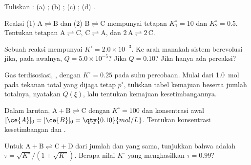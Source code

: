 \begin{exercise}[$\star$]\label{exo:b1:extent-q-and-k:4}
Tuliskan : (a) ;
(b) ; (c) ; (d) .
\end{exercise}

\begin{exercise}[$\star\star$]\label{exo:b1:extent-q-and-k:5}
Reaksi (1) $\mathrm{A \rightleftharpoons B}$ dan (2) $\mathrm{B \rightleftharpoons C}$ mempunyai tetapan
$K_1^\circ = 10$ dan $K_2^\circ = 0.5$. Tentukan tetapan $\mathrm{A \rightleftharpoons C}$,
$\mathrm{C \rightleftharpoons A}$, dan $\mathrm{2\,A \rightleftharpoons 2\,C}$.
\end{exercise}

\begin{exercise}[$\star\star$]\label{exo:b1:extent-q-and-k:6}
Sebuah reaksi mempunyai $K^\circ = 2.0 \times 10^{-3}$. Ke arah manakah
sistem berevolusi jika, pada awalnya, $Q = 5.0 \times 10^{-5}$? Jika
$Q = 0.10$? Jika hanya ada pereaksi?
\end{exercise}

\begin{exercise}[$\star\star$]\label{exo:b1:extent-q-and-k:7}
Gas  terdisosiasi, , dengan $K^\circ = 0.25$
pada suhu percobaan. Mulai dari \qty{1.0}{mol}  pada tekanan total
yang dijaga tetap $p^\circ$, tuliskan tabel kemajuan beserta jumlah
totalnya, nyatakan $Q(\xi)$, lalu tentukan kemajuan kesetimbangannya.
\end{exercise}

\begin{exercise}[$\star\star$]\label{exo:b1:extent-q-and-k:8}
Dalam larutan, $\mathrm{A + B \rightleftharpoons C}$ dengan $K^\circ = 100$ dan konsentrasi
awal $[\ce{A}]_0 = [\ce{B}]_0 = \qty{0.10}{mol/L}$. Tentukan konsentrasi
kesetimbangan dan .
\end{exercise}

\begin{exercise}[$\star\star$]\label{exo:b1:extent-q-and-k:9}
Untuk $\mathrm{A + B \rightleftharpoons C + D}$ dari jumlah  dan  yang sama,
tunjukkan bahwa  adalah
$\tau = \sqrt{K^\circ}/(1 + \sqrt{K^\circ})$.
Berapa nilai $K^\circ$ yang menghasilkan $\tau = 0.99$?
\end{exercise}

